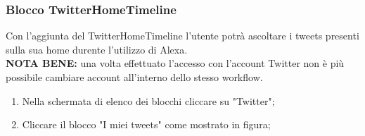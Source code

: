 \subsubsection{Blocco TwitterHomeTimeline} \label{twitterHo}
Con l'aggiunta del TwitterHomeTimeline l'utente potrà ascoltare i tweets presenti sulla sua home durente l'utilizzo di Alexa.\\
\textbf{NOTA BENE:} una volta effettuato l'accesso con l'account Twitter non è più possibile cambiare account all'interno dello stesso workflow.
\begin{enumerate}
	\item Nella schermata di elenco dei blocchi cliccare su "Twitter";
	\item Cliccare il blocco "I miei tweets" come mostrato in figura;
	\begin{figure}[!ht]
		\centering

\end{figure}
\end{enumerate}
